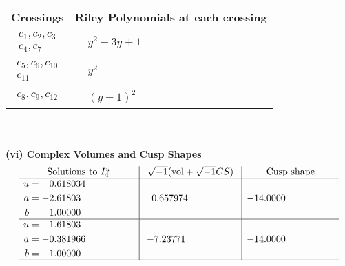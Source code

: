 \documentclass[1p]{elsarticle_modified}
\theoremstyle{definition}
\newcommand{\I}{\sqrt{-1}}
\begin{document}
\begin{tabular}{m{50pt}|m{274pt}}
Crossings & \hspace{64pt}Riley Polynomials at each crossing \\
\hline $$\begin{aligned}c_{1},c_{2},c_{3}\\c_{4},c_{7}\end{aligned}$$&$\begin{aligned}
&y^2-3 y+1
\end{aligned}$\\
\hline $$\begin{aligned}c_{5},c_{6},c_{10}\\c_{11}\end{aligned}$$&$\begin{aligned}
&y^2
\end{aligned}$\\
\hline $$\begin{aligned}c_{8},c_{9},c_{12}\end{aligned}$$&$\begin{aligned}
&(y-1)^2
\end{aligned}$\\
\hline
\end{tabular}\\~\\
\newpage\flushleft \textbf{(vi) Complex Volumes and Cusp Shapes}
$$\begin{array}{c|c|c}  
\text{Solutions to }I^u_{4}& \I (\text{vol} + \sqrt{-1}CS) & \text{Cusp shape}\\
 \hline 
\begin{aligned}
u &= \phantom{-}0.618034\phantom{ +0.000000I} \\
a &= -2.61803\phantom{ +0.000000I} \\
b &= \phantom{-}1.00000\phantom{ +0.000000I}\end{aligned}
 & \phantom{-}0.657974\phantom{ +0.000000I} & -14.0000\phantom{ +0.000000I} \\ \hline\begin{aligned}
u &= -1.61803\phantom{ +0.000000I} \\
a &= -0.381966\phantom{ +0.000000I} \\
b &= \phantom{-}1.00000\phantom{ +0.000000I}\end{aligned}
 & -7.23771\phantom{ +0.000000I} & -14.0000\phantom{ +0.000000I}\\
 \hline 
 \end{array}$$\newpage
\newpage\renewcommand{\arraystretch}{1}
\end{document}
